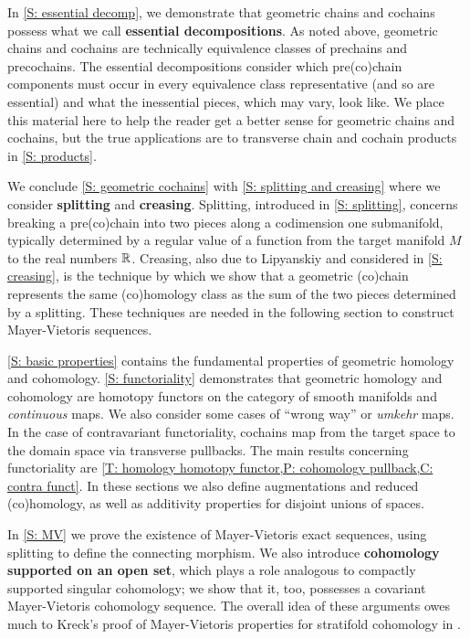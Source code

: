 In \cref{S: essential decomp}, we demonstrate that geometric chains and cochains possess what we call \textbf{essential decompositions}.
As noted above, geometric chains and cochains are technically equivalence classes of prechains and precochains.
The essential decompositions consider which pre(co)chain components must occur in every equivalence class representative (and so are essential) and what the inessential pieces, which may vary, look like.
We place this material here to help the reader get a better sense for geometric chains and cochains, but the true applications are to transverse chain and cochain products in \cref{S: products}.

We conclude \cref{S: geometric cochains} with \cref{S: splitting and creasing} where we consider \textbf{splitting} and \textbf{creasing}.
Splitting, introduced in \cref{S: splitting}, concerns breaking a pre(co)chain into two pieces along a codimension one submanifold, typically determined by a regular value of a function from the target manifold $M$ to the real numbers $\mathbb{R}$.
Creasing, also due to Lipyanskiy and considered in \cref{S: creasing}, is the technique by which we show that a geometric (co)chain represents the same (co)homology class as the sum of the two pieces determined by a splitting.
These techniques are needed in the following section to construct Mayer-Vietoris sequences.

\cref{S: basic properties} contains the fundamental properties of geometric homology and cohomology.
\cref{S: functoriality} demonstrates that geometric homology and cohomology are homotopy functors on the category of smooth manifolds and \textit{continuous} maps.
We also consider some cases of ``wrong way'' or \textit{umkehr} maps.
In the case of contravariant functoriality, cochains map from the target space to the domain space via transverse pullbacks.
The main results  concerning functoriality are \cref{T: homology homotopy functor,P: cohomology pullback,C: contra funct}.
In these sections we also define augmentations and reduced (co)homology, as well as additivity properties for disjoint unions of spaces.

In \cref{S: MV} we prove the existence of Mayer-Vietoris exact sequences, using splitting to define the connecting morphism.
We also introduce \textbf{cohomology supported on an open set}, which plays a role analogous to compactly supported singular cohomology; we show that it, too, possesses a covariant Mayer-Vietoris cohomology sequence.
The overall idea of these arguments owes much to Kreck's proof of Mayer-Vietoris properties for stratifold cohomology in \cite{Krec10}.

